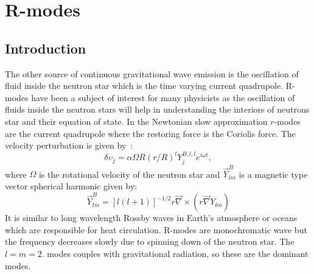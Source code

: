 \documentclass{ttuthes2007}
\begin{document}
\chapter{\textbf{R-modes}}

\section{Introduction}
The other source of  continuous gravitational wave emission is the oscillation of fluid
inside the neutron star which is the time varying current quadrupole.  R-modes
have been a subject of interest for many physicists as the oscillation of fluids
inside the neutron stars  will help in understanding the interiors of neutrons
star and their equation of state. In the Newtonian slow approximation $r$-modes are the current quadrupole
where the restoring force is the Coriolis force. 
The velocity perturbation is given by~\cite{Owen:1998xg}:
\begin{equation}
\delta{\upsilon_j}=\alpha\Omega R(r/R)^ l Y_j^{B,l,l}e^{i \omega t},
\end{equation}
where $\Omega$ is the rotational velocity of the neutron star and $\vec{Y}_{lm}^B$ is a magnetic type vector spherical harmonic given by:
\begin{equation}
\vec{Y}_{lm}^B=[l(l+1)]^{-1/2} r \vec{\nabla} \times (r \vec{\nabla}Y_{lm})
\end{equation}
It is similar to long
wavelength Rossby waves in Earth's atmosphere or oceans which are responsible for
heat circulation. R-modes are monochromatic wave but the frequency decreases
slowly due to spinning down of the neutron star. The $l=m=2$.
modes couples with gravitational radiation, so these are the dominant modes.
\end{document}
